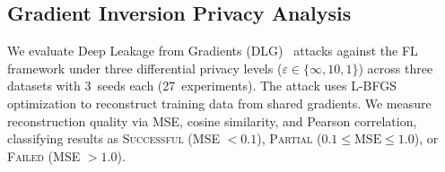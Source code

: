 \documentclass[conference]{IEEEtran}
\begin{document}
\subsection{Gradient Inversion Privacy Analysis}
\label{sec:gradient_inversion}

We evaluate Deep Leakage from Gradients (DLG)~\cite{zhu2019deep} attacks against the FL framework under three differential privacy levels ($\varepsilon \in \{\infty, 10, 1\}$) across three datasets with 3~seeds each (27~experiments). The attack uses L-BFGS optimization to reconstruct training data from shared gradients. We measure reconstruction quality via MSE, cosine similarity, and Pearson correlation, classifying results as \textsc{Successful} (MSE $< 0.1$), \textsc{Partial} ($0.1 \leq \text{MSE} \leq 1.0$), or \textsc{Failed} (MSE $> 1.0$).
\end{document}
